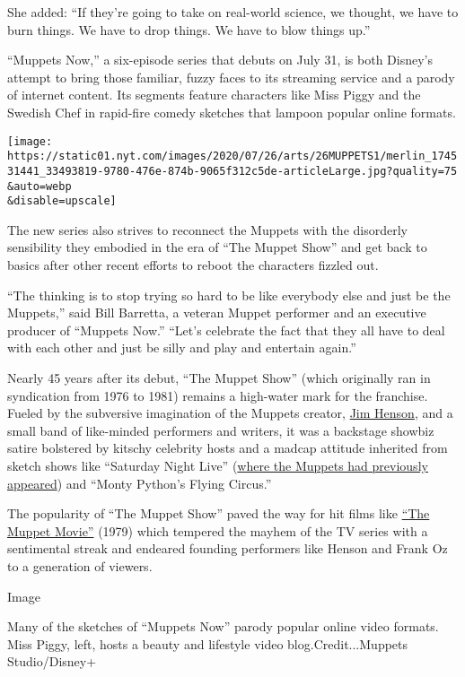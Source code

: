She added: ``If they're going to take on real-world science, we thought,
we have to burn things. We have to drop things. We have to blow things
up.''

``Muppets Now,'' a six-episode series that debuts on July 31, is both
Disney's attempt to bring those familiar, fuzzy faces to its streaming
service and a parody of internet content. Its segments feature
characters like Miss Piggy and the Swedish Chef in rapid-fire comedy
sketches that lampoon popular online formats.

\texttt{[image: https://static01.nyt.com/images/2020/07/26/arts/26MUPPETS1/merlin\_174531441\_33493819-9780-476e-874b-9065f312c5de-articleLarge.jpg?quality=75\\\&auto=webp\\\&disable=upscale]}

The new series also strives to reconnect the Muppets with the disorderly
sensibility they embodied in the era of ``The Muppet Show'' and get back
to basics after other recent efforts to reboot the characters fizzled
out.

``The thinking is to stop trying so hard to be like everybody else and
just be the Muppets,'' said Bill Barretta, a veteran Muppet performer
and an executive producer of ``Muppets Now.'' ``Let's celebrate the fact
that they all have to deal with each other and just be silly and play
and entertain again.''

Nearly 45 years after its debut, ``The Muppet Show'' (which originally
ran in syndication from 1976 to 1981) remains a high-water mark for the
franchise. Fueled by the subversive imagination of the Muppets creator,
\href{https://www.nytimes.com/1990/05/17/obituaries/jim-henson-puppeteer-dies-the-muppets-creator-was-53.html?searchResultPosition=10}{Jim
Henson}, and a small band of like-minded performers and writers, it was
a backstage showbiz satire bolstered by kitschy celebrity hosts and a
madcap attitude inherited from sketch shows like ``Saturday Night Live''
(\href{https://www.nbc.com/saturday-night-live/video/dregs-and-vestiges/n8614}{where
the Muppets had previously appeared}) and ``Monty Python's Flying
Circus.''

The popularity of ``The Muppet Show'' paved the way for hit films like
\href{https://www.youtube.com/watch?v=WS3Lkc6Gzlk}{``The Muppet Movie''}
(1979) which tempered the mayhem of the TV series with a sentimental
streak and endeared founding performers like Henson and Frank Oz to a
generation of viewers.

Image

Many of the sketches of ``Muppets Now'' parody popular online video
formats. Miss Piggy, left, hosts a beauty and lifestyle video
blog.Credit...Muppets Studio/Disney+

